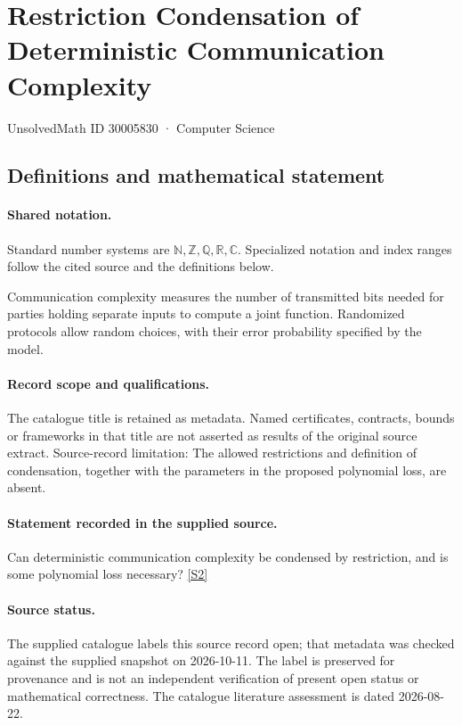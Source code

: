 \documentclass[11pt]{article}
\newcommand{\sref}[2]{\hyperlink{source:#1:#2}{[S#2]}}
\begin{document}
\setcounter{section}{30005829}
\section{Restriction Condensation of Deterministic Communication Complexity}\label{30005830}
{\small\sffamily UnsolvedMath ID 30005830 · Computer Science}
\subsection{Definitions and mathematical statement}

\paragraph{Shared notation.}Standard number systems are $\mathbb N,\mathbb Z,\mathbb Q,\mathbb R,\mathbb C$. Specialized notation and index ranges follow the cited source and the definitions below.


Communication complexity measures the number of transmitted bits needed for parties holding separate inputs to compute a joint function. Randomized protocols allow random choices, with their error probability specified by the model.
\paragraph{Record scope and qualifications.}
The catalogue title is retained as metadata. Named certificates, contracts, bounds or frameworks in that title are not asserted as results of the original source extract.
Source-record limitation: The allowed restrictions and definition of condensation, together with the parameters in the proposed polynomial loss, are absent.
\paragraph{Statement recorded in the supplied source.}
Can deterministic communication complexity be condensed by restriction, and is some polynomial loss necessary? \sref{30005830}{2}
\paragraph{Source status.}
The supplied catalogue labels this source record open; that metadata was checked against the supplied snapshot on 2026-10-11. The label is preserved for provenance and is not an independent verification of present open status or mathematical correctness. The catalogue literature assessment is dated 2026-08-22.
\end{document}

